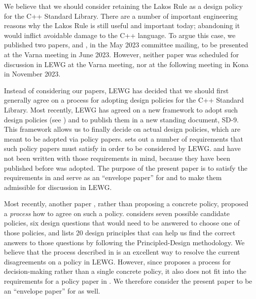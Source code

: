 We believe that we should consider retaining the Lakos Rule as a design policy for the C++ Standard Library. There are a number of important engineering reasons why the Lakos Rule is still useful and important today; abandoning it would inflict avoidable damage to the C++ language. To argue this case, we published two papers, \cite{P2831R0} and \cite{P2861R0}, in the May 2023 committee mailing, to be presented at the Varna meeting in June 2023. However, neither paper was scheduled for discussion in LEWG at the Varna meeting, nor at the following meeting in Kona in November 2023.

Instead of considering our papers, LEWG has decided that we should first generally agree on a process for adopting design policies for the C++ Standard Library. Most recently, LEWG has agreed on a new framework to adopt such design policies (see \cite{P2267R1}) and to publish them in a new standing document, SD-9. This framework allows us to finally decide on actual design policies, which are meant to be adopted via policy papers. \cite{P2267R1} sets out a number of requirements that such policy papers must satisfy in order to be considered by LEWG. \cite{P2831R0} and \cite{P2861R0} have not been written with those requirements in mind, because they have been published before \cite{P2267R1} was adopted. The purpose of the present paper is to satisfy the requirements in \cite{P2267R1} and serve as an ``envelope paper'' for \cite{P2831R0} and \cite{P2861R0} to make them admissible for discussion in LEWG.

Most recently, another paper \cite{P3005R0}, rather than proposing a concrete  policy, proposed a \emph{process} how to agree on such a policy. \cite{P3005R0} considers seven possible candidate  policies, six design questions that would need to be answered to choose one of those policies, and lists 20 design principles that can help us find the correct answers to those questions by following the Principled-Design methodology. We believe that the process described in \cite{P3005R0} is an excellent way to resolve the current disagreements on a  policy in LEWG. However, since \cite{P3005R0} proposes a process for decision-making rather than a single concrete policy, it also does not fit into the requirements for a policy paper in \cite{P2267R1}. We therefore consider the present paper to be an ``envelope paper'' for  \cite{P3005R0} as well.



